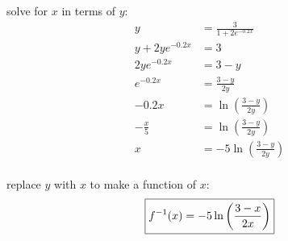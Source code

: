 \documentclass[fleqn,addpoints]{exam}
\begin{document}
\begin{questions}
\begin{solution}
        solve for $x$ in terms of $y$:
        \begin{align*}
          y               & = \frac{3}{1 + 2e^{-0.2x}} \\
          y + 2ye^{-0.2x} & = 3 \\
          2ye^{-0.2x}     & = 3 - y \\
          e^{-0.2x}       & = \frac{3 - y}{2y} \\
          -0.2x           & = \ln \left( \frac{3 - y}{2y} \right) \\
          - \frac{x}{5}   & = \ln \left( \frac{3 - y}{2y} \right) \\
          x               & = -5 \ln \left( \frac{3 - y}{2y} \right) \\
        \end{align*}
        
        replace $y$ with $x$ to make a function of $x$:
        \[
          \boxed{ f^{-1}(x) = -5 \ln \left( \frac{3 - x}{2x} \right) } \\
        \]

      \end{solution}
  \end{questions}
\end{document}
